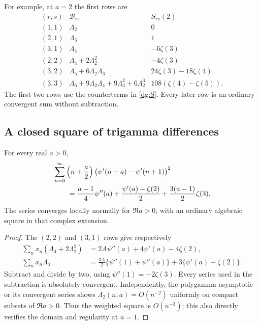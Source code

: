 For example, at $a=2$ the first rows are
\[
\begin{array}{c|c|c}
 (r,s)&\mathcal B_{rs}&S_{rs}(2)\\\hline
 (1,1)&\Lambda_2&0\\
 (2,1)&\Lambda_3&1\\
 (3,1)&\Lambda_4&-6\zeta(3)\\
 (2,2)&\Lambda_4+2\Lambda_2^2&-4\zeta(3)\\
 (3,2)&\Lambda_5+6\Lambda_2\Lambda_3&24\zeta(3)-18\zeta(4)\\
 (3,3)&\Lambda_6+9\Lambda_2\Lambda_4+9\Lambda_3^2+6\Lambda_2^3
                                    &108(\zeta(4)-\zeta(5)).
\end{array}
\]
The first two rows use the counterterms in \eqref{dg:S}.
Every later row is an ordinary convergent sum without subtraction.

\subsection{A closed square of trigamma differences}

\begin{theorem}
\label{dg:square}
For every real $a>0$,
\begin{align}
 &\sum_{n=0}^{\infty}\left(n+\frac a2\right)
       \bigl(\psi'(n+a)-\psi'(n+1)\bigr)^2\notag\\
 &\qquad=\frac{a-1}{4}\psi''(a)
     +\frac{\psi'(a)-\zeta(2)}2
     +\frac{3(a-1)}2\zeta(3).
 \label{dg:square-eq}
\end{align}
The series converges locally normally for $\Re a>0$, with an
ordinary algebraic square in that complex extension.
\end{theorem}
\begin{proof}
The $(2,2)$ and $(3,1)$ rows give respectively
\begin{align*}
 \sum_nx_n(\Lambda_4+2\Lambda_2^2)
   &=2A\psi''(a)+4\psi'(a)-4\zeta(2),\\
 \sum_nx_n\Lambda_4
   &=\frac{3A}{2}\{\psi''(1)+\psi''(a)\}
                                  +3\{\psi'(a)-\zeta(2)\}.
\end{align*}
Subtract and divide by two, using $\psi''(1)=-2\zeta(3)$.
Every series used in the subtraction is absolutely convergent.
Independently, the polygamma asymptotic or its convergent series
shows $\Lambda_2(n;a)=O(n^{-2})$ uniformly on compact subsets of
$\Re a>0$. Thus the weighted square is $O(n^{-3})$; this also
directly verifies the domain and regularity at $a=1$.
\end{proof}

